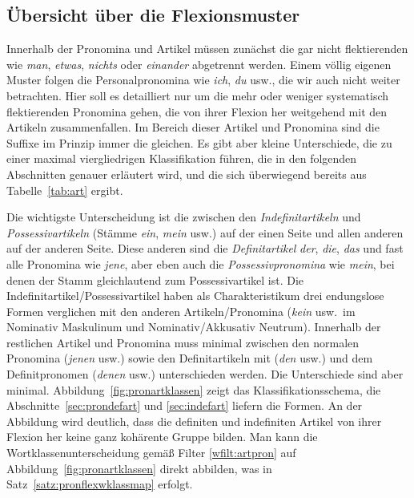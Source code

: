 \subsection{Übersicht über die Flexionsmuster}


Innerhalb der Pronomina und Artikel müssen zunächst die gar nicht flektierenden wie \textit{man}, \textit{etwas}, \textit{nichts} oder \textit{einander} abgetrennt werden.
Einem völlig eigenen Muster folgen die Personalpronomina wie \textit{ich}, \textit{du} usw., die wir auch nicht weiter betrachten.
Hier soll es detailliert nur um die mehr oder weniger systematisch flektierenden Pronomina gehen, die von ihrer Flexion her weitgehend mit den Artikeln zusammenfallen.
Im Bereich dieser Artikel und Pronomina sind die Suffixe im Prinzip immer die gleichen.
Es gibt aber kleine Unterschiede, die zu einer maximal viergliedrigen Klassifikation führen, die in den folgenden Abschnitten genauer erläutert wird, und die sich überwiegend bereits aus Tabelle~\ref{tab:art} ergibt.

Die wichtigste Unterscheidung ist die zwischen den \textit{Indefinitartikeln} und \textit{Possessivartikeln} (Stämme \textit{ein}, \textit{mein} usw.) auf der einen Seite und allen anderen auf der anderen Seite.
Diese anderen sind die \textit{Definitartikel} \textit{der}, \textit{die}, \textit{das} und fast alle Pronomina wie \textit{jene}, aber eben auch die \textit{Possessivpronomina} wie \textit{mein}, bei denen der Stamm gleichlautend zum Possessivartikel ist.
Die Indefinitartikel\slash Possessivartikel haben als Charakteristikum drei endungslose Formen verglichen mit den anderen Artikeln\slash Pronomina (\textit{kein} usw.\ im Nominativ Maskulinum und Nominativ\slash Akkusativ Neutrum).
Innerhalb der restlichen Artikel und Pronomina muss minimal zwischen den normalen Pronomina (\textit{jenen} usw.) sowie den Definitartikeln mit (\textit{den} usw.) und dem Definitpronomen (\textit{denen} usw.) unterschieden werden.
Die Unterschiede sind aber minimal.
Abbildung~\ref{fig:pronartklassen} zeigt das Klassifikationsschema, die Abschnitte~\ref{sec:prondefart} und \ref{sec:indefart} liefern die Formen.
An der Abbildung wird deutlich, dass die definiten und indefiniten Artikel von ihrer Flexion her keine ganz kohärente Gruppe bilden.
Man kann die Wortklassenunterscheidung gemäß Filter \ref{wfilt:artpron} auf Abbildung~\ref{fig:pronartklassen} direkt abbilden, was in Satz~\ref{satz:pronflexwklassmap} erfolgt.

